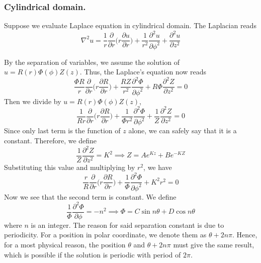 \documentclass[../../../main.tex]{subfiles}
\begin{document}
\subsubsection{Cylindrical domain.} Suppose we evaluate Laplace equation in cylindrical domain. 
The Laplacian reads
\begin{equation*}
    \nabla^2u= \frac{1}{r}\frac{\partial}{\partial r}\Biggl(r\frac{\partial u}{\partial r}\Biggr)+\frac{1}{r^2} \frac{\partial^2u}{\partial \phi^2}+ \frac{\partial^2u}{\partial z^2}
\end{equation*}

By the separation of variables, we assume the solution of $u=R(r)\Phi(\phi)Z(z)$. 
Thus, the Laplace's equation now reads
\begin{equation*}
    \frac{\Phi R}{r}\frac{\partial}{\partial r}\Biggl(r\frac{\partial R}{\partial r}\Biggr)
    +\frac{RZ}{r^2} \frac{\partial^2\Phi}{\partial \phi^2}
    + R\Phi\frac{\partial^2Z}{\partial z^2}=0
\end{equation*}
Then we divide by $u=R(r)\Phi(\phi)Z(z)$,
\begin{equation*}
    \frac{1}{Rr}\frac{\partial}{\partial r}\Biggl(r\frac{\partial R}{\partial r}\Biggr)
    +\frac{1}{\Phi r^2} \frac{\partial^2\Phi}{\partial \phi^2}
    + \frac{1}{Z}\frac{\partial^2Z}{\partial z^2}=0
\end{equation*}
Since only last term is the function of $z$ alone, we can safely say that it is a constant. 
Therefore, we define
\begin{equation*}
    \frac{1}{Z}\frac{\partial^2Z}{\partial z^2}=K^2\implies Z=Ae^{Kz}+Be^{-KZ}
\end{equation*}
Substituting this value and multiplying by $r^2$, we have
\begin{equation*}
    \frac{r}{R}\frac{\partial}{\partial r}\Biggl(r\frac{\partial R}{\partial r}\Biggr)
    +\frac{1}{\Phi } \frac{\partial^2\Phi}{\partial \phi^2}
    +K^2r^2=0
\end{equation*}
Now we see that the second term is constant. 
We define
\begin{equation*}
    \frac{1}{\Phi}\frac{\partial^2 \Phi}{\partial \phi}=-n^2\implies \Phi=C\sin n\theta +D\cos n\theta
\end{equation*}
where $n$ is an integer. 
The reason for said separation constant is due to periodicity. 
For a position in polar coordinate, we denote them as $\theta+2n\pi$. 
Hence, for a most physical reason, the position $\theta$ and $\theta+2n\pi$ must give the same result, which is possible if the solution is periodic with period of $2\pi$. 
\end{document}
